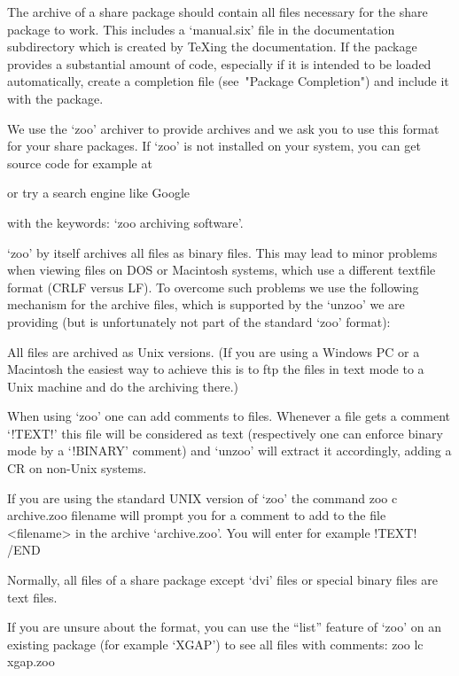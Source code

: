 The archive of a share package should contain all files necessary for the
share package to work. This includes a `manual.six' file in the
documentation subdirectory which is created by {\TeX}ing the documentation.
If the package provides a substantial amount of code,
especially if it is intended to be loaded automatically, create a completion
file (see~"Package Completion") and include it with the package.

We use the `zoo' archiver to provide {\GAP} archives and we ask you to
use this format for your share packages. If `zoo' is not installed on your
system, you can get source code for example at

or try a search engine like Google

with the keywords: `zoo archiving software'.

`zoo' by itself archives all files as binary files. This may lead to minor
problems when viewing files on DOS or Macintosh systems, which use a
different textfile format (CRLF versus LF). To overcome such problems we use
the following mechanism for the {\GAP} archive files, which is supported by
the `unzoo' we are providing (but is unfortunately not part of the standard
`zoo' format):

All files are archived as Unix versions. (If you are using a Windows PC or a
Macintosh the easiest way to achieve this is to ftp the files in text mode
to a Unix machine and do the archiving there.)

When using `zoo' one can add comments to files. Whenever a file gets a comment
`!TEXT!' this file  will be considered as text (respectively one can enforce
binary mode by a `!BINARY' comment) and `unzoo' will extract it accordingly,
adding a CR on non-Unix systems.

If you are using the standard UNIX version of `zoo' the command
\begintt
zoo c archive.zoo filename
\endtt
will prompt you for a comment to add to the file <filename> in the archive
`archive.zoo'. You will enter for example
\begintt
!TEXT!
/END
\endtt

Normally, all files of a share package except `dvi' files or special binary
files are text files.

If you are unsure about the format, you can use the ``list'' feature of
`zoo' on an existing package (for example `XGAP') to see all files with
comments:
\begintt 
zoo lc xgap.zoo
\endtt 


